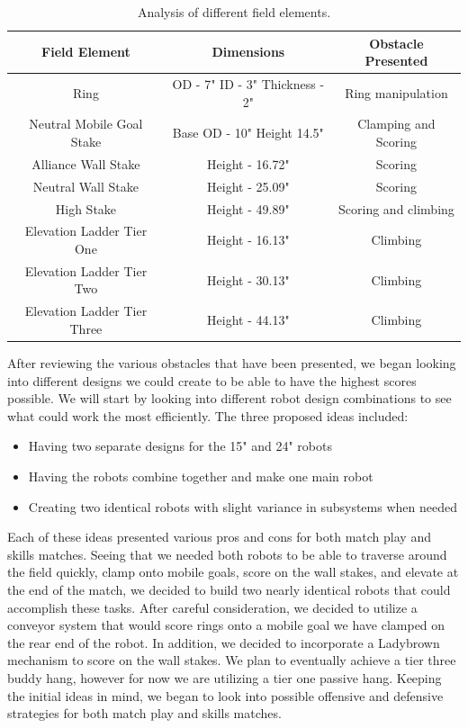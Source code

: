 \begin{table}[h!]
    \centering
    \begin{tabular}{c|c|c}
    \toprule
    \textbf{Field Element} & \textbf{Dimensions} & \textbf{Obstacle Presented} \\
    \midrule
    Ring & OD - 7" ID - 3" Thickness - 2"  & Ring manipulation \\ 
    Neutral Mobile Goal Stake & Base OD - 10" Height 14.5" & Clamping and Scoring  \\ 
    Alliance Wall Stake & Height - 16.72"   & Scoring \\
    Neutral Wall Stake & Height - 25.09" & Scoring \\ 
    High Stake & Height - 49.89" & Scoring and climbing \\
    Elevation Ladder Tier One & Height - 16.13" & Climbing \\ 
    Elevation Ladder Tier Two & Height - 30.13" & Climbing \\ 
    Elevation Ladder Tier Three & Height - 44.13" & Climbing \\ 
    \bottomrule
    \end{tabular}
    \caption{Analysis of different field elements.}
    \label{tab:field element challenges}
\end{table}

After reviewing the various obstacles that have been presented, we began looking into
different designs we could create to be able to have the highest scores possible. We will start by
looking into different robot design combinations to see what could work the most efficiently.
The three proposed ideas included:
\begin{itemize}
    \item Having two separate designs for the 15" and 24" robots
    \item Having the robots combine together and make one main robot
    \item Creating two identical robots with slight variance in subsystems when needed
\end{itemize}
Each of these ideas presented various pros and cons for both match play and skills
matches. Seeing that we needed both robots to be able to traverse around the field quickly,  clamp onto mobile goals, score on the wall stakes, and elevate at the end of the match, we decided to build two nearly identical robots that could accomplish these tasks. After careful consideration, we decided to utilize a conveyor system that would score rings onto a mobile goal we have clamped on the rear end of the robot. In addition, we decided to incorporate a Ladybrown mechanism to score on the wall stakes. We plan to eventually achieve a tier three buddy hang, however for now we are utilizing a tier one passive hang. Keeping the initial ideas in mind, we began to look into possible
offensive and defensive strategies for both match play and skills matches.
